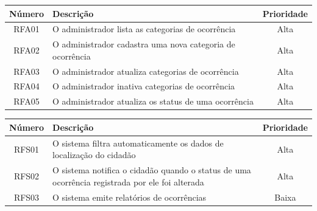 \begin{quadro}[htb]
	\caption{\label{requisitos_funcionais_admin}Requisitos Funcionais de Administrador}
	\begin{tabular}{|c|>{\centering\arraybackslash}m{9cm}|c|}
		\hline
		\textbf{Número} & \textbf{Descrição} & \textbf{Prioridade}\\ \hline
		RFA01 & O administrador lista as categorias de ocorrência & Alta \\ \hline
		RFA02 & O administrador cadastra uma nova categoria de ocorrência & Alta \\ \hline
		RFA03 & O administrador atualiza categorias de ocorrência & Alta \\ \hline
		RFA04 & O administrador inativa categorias de ocorrência & Alta \\ \hline
		RFA05 & O administrador atualiza os status de uma ocorrência & Alta \\ \hline
	\end{tabular}
\end{quadro}

\begin{quadro}[htb]
	\caption{\label{requisitos_funcionais_sistema}Requisitos Funcionais de Sistema}
	\begin{tabular}{|c|>{\centering\arraybackslash}m{9cm}|c|}
		\hline
		\textbf{Número} & \textbf{Descrição} & \textbf{Prioridade}\\ \hline
		RFS01 & O sistema filtra automaticamente os dados de localização do cidadão & Alta \\ \hline
		RFS02 & O sistema notifica o cidadão quando o status de uma ocorrência registrada por ele foi alterada & Alta \\ \hline
		RFS03 & O sistema emite relatórios de ocorrências & Baixa \\ \hline
	\end{tabular}
\end{quadro}
